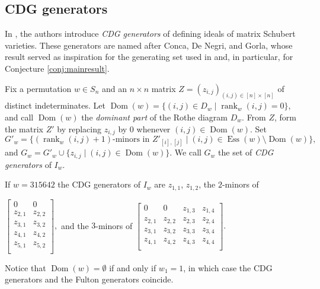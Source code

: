 \documentclass[ALCO,Unicode,published]{cedram}
\DeclareMathOperator{\Ess}{Ess}
\DeclareMathOperator{\rank}{rank}
\DeclareMathOperator{\Dom}{Dom}
\begin{document}
\subsection{CDG generators}\label{subsect:CDG}

In \cite{HPW}, the authors introduce \emph{CDG generators} of defining ideals of matrix Schubert varieties.  These generators are named after Conca, De Negri, and Gorla, whose result \cite[Theorem 4.2]{CDG15} served as inspiration for the generating set used in \cite{HPW} and, in particular, for Conjecture \ref{conj:mainresult}.

\begin{definition}
Fix a permutation $w \in S_n$ and an $n \times n$ matrix $Z = (z_{i,j})_{(i,j) \in [n] \times [n]}$ of distinct indeterminates.  Let $\Dom(w) = \{(i,j) \in D_w \mid \rank_w(i,j) = 0\}$, and call $\Dom(w)$ the \emph{dominant part} of the Rothe diagram $D_w$.  From $Z$, form the matrix $Z'$ by replacing $z_{i,j}$ by $0$ whenever $(i,j) \in \Dom(w)$.  Set \[
	G'_w = \{(\rank_w(i,j)+1)\text{-minors in } Z'_{[i],[j]} \mid (i,j) \in \Ess(w)\setminus \Dom(w) \},
\] and $G_w = G'_w \cup \{z_{i,j} \mid (i,j) \in \Dom(w)\}$.  We call $G_w$ the set of \emph{CDG generators} of $I_w$.
\end{definition}

\begin{example}
If $w = 315642$ the CDG generators of $I_w$ are $z_{1,1}$, $z_{1,2}$, the $2$-minors of \begin{center} $\begin{bmatrix}
0 & 0\\
z_{2,1} & z_{2,2}\\
z_{3,1} & z_{3,2}\\
z_{4,1} & z_{4,2}\\
z_{5,1} & z_{5,2}\\
\end{bmatrix},
$ and the $3$-minors of  $\begin{bmatrix}
0 & 0 & z_{1,3} & z_{1,4}\\
z_{2,1} & z_{2,2} & z_{2,3} & z_{2,4}\\
z_{3,1} & z_{3,2} & z_{3,3} & z_{3,4}\\
z_{4,1} & z_{4,2} & z_{4,3} & z_{4,4}\\
\end{bmatrix}.
$ \end{center}
\end{example}

\noindent Notice that $\Dom(w) = \emptyset$ if and only if $w_1 = 1$, in which case the CDG generators and the Fulton generators coincide.  
\end{document}

